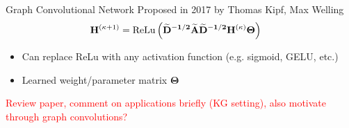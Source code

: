 \documentclass{beamer}
\newcommand{\node}{v}
\newcommand{\nrepresent}{h}
\newcommand{\NodeRepMat}{\mathbf{H}}
\newcommand{\edge}{e}
\newcommand{\DegMat}{\mathbf{D}}
\newcommand{\iter}{\kappa}
\newcommand{\AdjMat}{\mathbf{A}}
\newcommand{\ReLu}{\text{ReLu}}
\begin{document}
\begin{frame}{Graph Convolutional Network}
    Proposed in 2017 by Thomas Kipf, Max Welling \cite{kipf_semi-supervised_2017}
        \begin{align*}
        \iffalse
            \mathbf{\nrepresent}_\node^{(\iter+1)} 
            &=
            \text{Update}
            \left( 
            x_\node^{(\iter)}
            ,   
            \text{Aggregate}
            (
                \nrepresent_\node^{(\iter)}, x_u^{(\iter)}, \edge_{u,\node}^{(\iter)}
            )
            \right)
        \\
        \fi 
            \NodeRepMat^{(\iter+1)} 
            &=
            \ReLu
            \left( 
                \mathbf{
                \widetilde{\DegMat}^{-1/2}
                \widetilde{\AdjMat}
                \widetilde{\DegMat}^{-1/2}  
                \NodeRepMat^{(\iter)}
                \Theta 
                }            
            \right)
    \end{align*}
    
    \begin{itemize}
        \item Can replace ReLu with any activation function (e.g. sigmoid, GELU, etc.)
        \item Learned weight/parameter matrix $\boldsymbol\Theta$
    \end{itemize}
    \textcolor{red}{Review paper, comment on applications briefly (KG setting), also motivate through graph convolutions?}
    \end{frame}
\end{document}
